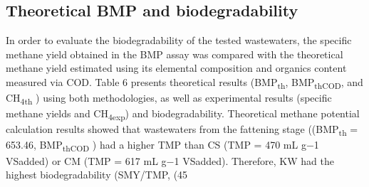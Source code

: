 \subsection{Theoretical BMP and biodegradability}
In order to evaluate the biodegradability of the tested wastewaters, the specific methane yield obtained in the BMP assay was compared with the theoretical methane yield estimated using its elemental composition and organics content measured via COD. Table 6 presents theoretical results (BMP\textsubscript{th}, BMP\textsubscript{thCOD}, and CH\textsubscript{4th} ) using both methodologies, as well as experimental results (specific methane yields and CH\textsubscript{4exp}) and  biodegradability.  Theoretical methane potential calculation results showed that wastewaters from the fattening stage ((BMP\textsubscript{th} = 653.46, BMP\textsubscript{thCOD} ) had a higher TMP than CS (TMP = 470 mL g−1 VSadded) or CM (TMP = 617 mL g−1 VSadded). Therefore, KW had the highest biodegradability (SMY/TMP, %
(45%
